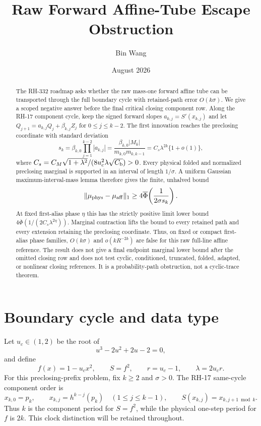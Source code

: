 \documentclass[11pt]{article}
\title{Raw Forward Affine-Tube Escape Obstruction}
\author{Bin Wang}
\date{August 2026}
\theoremstyle{definition}
\theoremstyle{remark}
\newcommand{\Phibar}{\overline\Phi}
\begin{document}
\maketitle

\begin{abstract}
The RH-332 roadmap asks whether the raw mass-one forward affine tube can be
transported through the full boundary cycle with retained-path error
$O(k\sigma)$.  We give a scoped negative answer before the final critical
closing component row.  Along the RH-17 component cycle, keep the signed
forward slopes $a_{k,j}=S'(x_{k,j})$ and let
$Q_{j+1}=a_{k,j}Q_j+\beta_{k,j}Z_j$ for $0\le j\le k-2$.
The first innovation reaches the preclosing coordinate with standard
deviation
\[
 s_k=\beta_{k,0}\prod_{j=1}^{k-2}|a_{k,j}|
 =\frac{\beta_{k,0}|M_k|}{m_{k,0}m_{k,k-1}}
 =C_s\lambda^{2k}\{1+o(1)\},
\]
where
$C_s=C_M\sqrt{1+\lambda^2}/(8u_c^2\lambda\sqrt{C_{\rm b}})>0$.
Every physical folded and normalized preclosing marginal is supported in an
interval of length $1/\sigma$.  A uniform Gaussian maximum-interval-mass
lemma therefore gives the finite, unhalved bound
\[
 \|\mu_{\rm phys}-\mu_{\rm aff}\|_1
 \ge4\Phibar\!\left(\frac1{2\sigma s_k}\right).
\]
At fixed first-alias phase $\eta$ this has the strictly positive limit lower
bound $4\Phibar(1/(2C_s\lambda^{2\eta}))$.  Marginal contraction lifts the
bound to every retained path and every extension retaining the preclosing
coordinate.  Thus, on fixed or compact first-alias phase families,
$O(k\sigma)$ and $o(kR^{-2k})$ are false for this raw full-line affine
reference.  The result does not give a final endpoint
marginal lower bound after the omitted closing row and does not test cyclic,
conditioned, truncated, folded, adapted, or nonlinear closing references.
It is a probability-path obstruction, not a cyclic-trace theorem.
\end{abstract}

\section{Boundary cycle and data type}

Let $u_c\in(1,2)$ be the root of
\begin{equation}\label{eq:cubic}
 u^3-2u^2+2u-2=0,
\end{equation}
and define
\begin{equation}\label{eq:map-constants}
 f(x)=1-u_cx^2,
 \qquad S=f^2,
 \qquad r=u_c-1,
 \qquad \lambda=2u_cr.
\end{equation}
For this preclosing-prefix problem, fix $k\ge2$ and $\sigma>0$.  The RH-17 same-cycle
component order is
\begin{equation}\label{eq:cycle-order}
 x_{k,0}=p_k,
 \qquad x_{k,j}=h^{k-j}(p_k)\quad(1\le j\le k-1),
 \qquad S(x_{k,j})=x_{k,j+1\bmod k}.
\end{equation}
Thus $k$ is the component period for $S=f^2$, while the physical one-step
period for $f$ is $2k$.  This clock distinction will be retained throughout.
\end{document}
